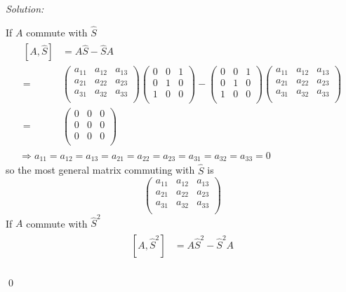 \documentclass[12pt,a4paper]{article}
\newenvironment{sol}
    {\emph{Solution:}
    }
    {
    \qed
    }
\begin{document}
\begin{sol}
\begin{itemize}
If $A$ commute with $\hat{S}$
\begin{gather}
\begin{align}
\nonumber[A,\hat{S}]&=A\hat{S}-\hat{S}A\\
\nonumber=&\left(\begin{array}{ccc}
a_{11}&a_{12}&a_{13}\\
a_{21}&a_{22}&a_{23}\\
a_{31}&a_{32}&a_{33}\\
\end{array}\right)\left(\begin{array}{ccc}
0&0&1\\
0&1&0\\
1&0&0\\
\end{array}\right)-\left(\begin{array}{ccc}
0&0&1\\
0&1&0\\
1&0&0\\
\end{array}\right)\left(\begin{array}{ccc}
a_{11}&a_{12}&a_{13}\\
a_{21}&a_{22}&a_{23}\\
a_{31}&a_{32}&a_{33}\\
\end{array}\right)\\
=&\left(\begin{array}{ccc}
0&0&0\\
0&0&0\\
0&0&0\\
\end{array}\right)
\end{align}\\
\Longrightarrow a_{11}=a_{12}=a_{13}=a_{21}=a_{22}=a_{23}=a_{31}=a_{32}=a_{33}=0
\end{gather}
so the most general matrix commuting with $\hat{S}$ is
\begin{equation}
\left(\begin{array}{ccc}
a_{11}&a_{12}&a_{13}\\
a_{21}&a_{22}&a_{23}\\
a_{31}&a_{32}&a_{33}\\
\end{array}\right)
\end{equation}
If $A$ commute with $\hat{S}^2$
\begin{gather}
\begin{align}
\nonumber[A,\hat{S}^2]&=A\hat{S}^2-\hat{S}^2A\\

\end{align}
\end{gather}
\end{itemize}
\end{sol}
\end{document}
